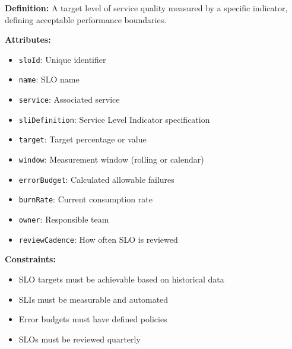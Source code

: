 \documentclass[11pt,letterpaper]{article}
\begin{document}
\begin{definitionbox}
\textbf{Definition:} A target level of service quality measured by a specific indicator, defining acceptable performance boundaries.

\textbf{Attributes:}
\begin{itemize}[nosep]
    \item \texttt{sloId}: Unique identifier
    \item \texttt{name}: SLO name
    \item \texttt{service}: Associated service
    \item \texttt{sliDefinition}: Service Level Indicator specification
    \item \texttt{target}: Target percentage or value
    \item \texttt{window}: Measurement window (rolling or calendar)
    \item \texttt{errorBudget}: Calculated allowable failures
    \item \texttt{burnRate}: Current consumption rate
    \item \texttt{owner}: Responsible team
    \item \texttt{reviewCadence}: How often SLO is reviewed
\end{itemize}

\textbf{Constraints:}
\begin{itemize}[nosep]
    \item SLO targets must be achievable based on historical data
    \item SLIs must be measurable and automated
    \item Error budgets must have defined policies
    \item SLOs must be reviewed quarterly
\end{itemize}
\end{definitionbox}
\end{document}
